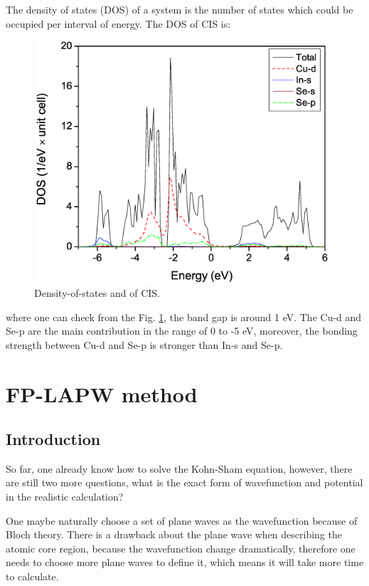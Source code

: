 \documentclass[a4paper, 12pt, titlepage,oneside,drop]{kthesis}
\begin{document}
\noindent The density of states (DOS) of a system is the number of states which could be occupied per interval of energy. The DOS of CIS is: 

\begin{figure}[H]
\begin{center}
\includegraphics[height=90mm, width=110mm]{CuInSe2_PDOS.eps}
\caption{Density-of-states and of CIS.}
\label{doscis}
\end{center}
\end{figure}

where one can check from the Fig. \ref{doscis}, the band gap is around 1 eV. The Cu-d and Se-p are the main contribution in the range of 0 to -5 eV, 
moreover, the bonding strength between Cu-d and Se-p is stronger than In-s and Se-p.



\chapter{FP-LAPW method}
\section{Introduction}
\noindent So far, one already know how to solve the Kohn-Sham equation, however, there are still two more questions, what is the exact form of 
wavefunction and potential in the realistic calculation?  

\noindent One maybe naturally choose a set of plane waves as the wavefunction because of Bloch theory. There is a drawback about the plane wave 
when describing the atomic core region, because the wavefunction change dramatically, therefore one needs to choose more plane
waves to define it, which means it will take more time to calculate.
\end{document}
